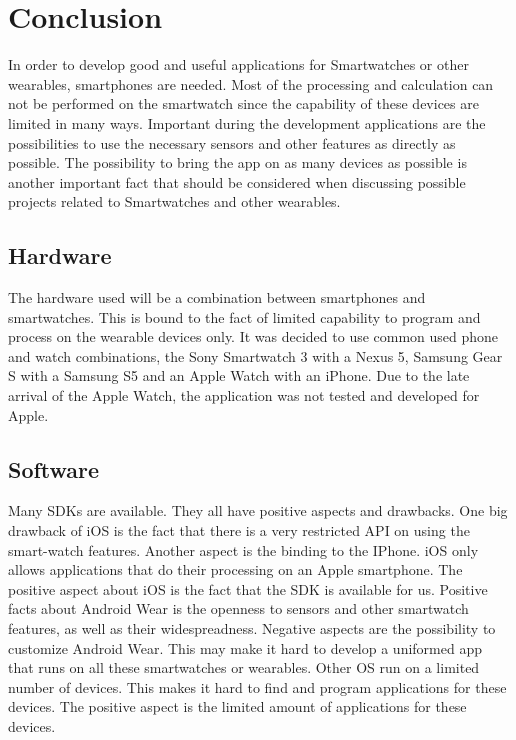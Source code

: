\section{Conclusion}

In order to develop good and useful applications for Smartwatches or other wearables, smartphones are needed. Most of the processing and calculation can not be performed on the smartwatch since the capability of these devices are limited in many ways.
Important during the development applications are the possibilities to use the necessary sensors and other features as directly as possible. 
The possibility to bring the app on as many devices as possible is another important fact that should be considered when discussing possible projects related to Smartwatches and other wearables. 

\subsection{Hardware}
The hardware used will be a combination between smartphones and smartwatches. This is bound to the fact of limited capability to program and process on the wearable devices only. It was decided to use common used phone and watch combinations, the Sony Smartwatch 3 with a Nexus 5, Samsung Gear S with a Samsung S5 and an Apple Watch with an iPhone. Due to the late arrival of the Apple Watch, the application was not tested and developed for Apple.

\subsection{Software}
Many SDKs are available. They all have positive aspects and drawbacks. 
One big drawback of iOS is the fact that there is a very restricted API on using the smart-watch features. Another aspect is the binding to the IPhone. iOS only allows applications that do their processing on an Apple smartphone.
The positive aspect about iOS is the fact that the SDK is available for us.
Positive facts about Android Wear is the openness to sensors and other smartwatch features, as well as their widespreadness. 
Negative aspects are the possibility to customize Android Wear. This may make it hard to develop a uniformed app that runs on all these smartwatches or wearables. 
Other OS run on a limited number of devices. This makes it hard to find and program applications for these devices. The positive aspect is the limited amount of applications for these devices. 
